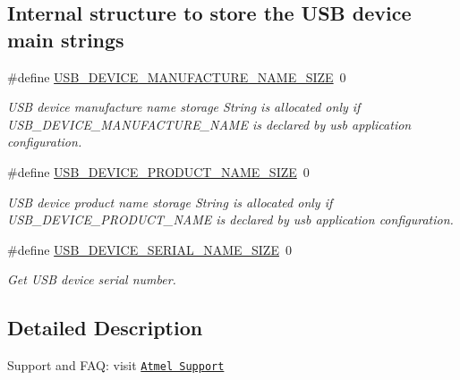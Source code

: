\subsection*{Internal structure to store the U\-S\-B device main strings}
\begin{DoxyCompactItemize}
\item 
\hypertarget{group__udc__group__interne_gac2dafd8d9efe73f2709291818829a79b}{\#define \hyperlink{group__udc__group__interne_gac2dafd8d9efe73f2709291818829a79b}{U\-S\-B\-\_\-\-D\-E\-V\-I\-C\-E\-\_\-\-M\-A\-N\-U\-F\-A\-C\-T\-U\-R\-E\-\_\-\-N\-A\-M\-E\-\_\-\-S\-I\-Z\-E}~0}\label{group__udc__group__interne_gac2dafd8d9efe73f2709291818829a79b}

\begin{DoxyCompactList}\small\item\em U\-S\-B device manufacture name storage String is allocated only if U\-S\-B\-\_\-\-D\-E\-V\-I\-C\-E\-\_\-\-M\-A\-N\-U\-F\-A\-C\-T\-U\-R\-E\-\_\-\-N\-A\-M\-E is declared by usb application configuration. \end{DoxyCompactList}\item 
\hypertarget{group__udc__group__interne_ga76a9e0f1f322165feaf0a8f2f583ea8f}{\#define \hyperlink{group__udc__group__interne_ga76a9e0f1f322165feaf0a8f2f583ea8f}{U\-S\-B\-\_\-\-D\-E\-V\-I\-C\-E\-\_\-\-P\-R\-O\-D\-U\-C\-T\-\_\-\-N\-A\-M\-E\-\_\-\-S\-I\-Z\-E}~0}\label{group__udc__group__interne_ga76a9e0f1f322165feaf0a8f2f583ea8f}

\begin{DoxyCompactList}\small\item\em U\-S\-B device product name storage String is allocated only if U\-S\-B\-\_\-\-D\-E\-V\-I\-C\-E\-\_\-\-P\-R\-O\-D\-U\-C\-T\-\_\-\-N\-A\-M\-E is declared by usb application configuration. \end{DoxyCompactList}\item 
\#define \hyperlink{group__udc__group__interne_gacf4c1ef7c6001ee2b919e81143543899}{U\-S\-B\-\_\-\-D\-E\-V\-I\-C\-E\-\_\-\-S\-E\-R\-I\-A\-L\-\_\-\-N\-A\-M\-E\-\_\-\-S\-I\-Z\-E}~0
\begin{DoxyCompactList}\small\item\em Get U\-S\-B device serial number. \end{DoxyCompactList}\end{DoxyCompactItemize}


\subsection{Detailed Description}
Support and F\-A\-Q\-: visit \href{http://www.atmel.com/design-support/}{\tt Atmel Support}

